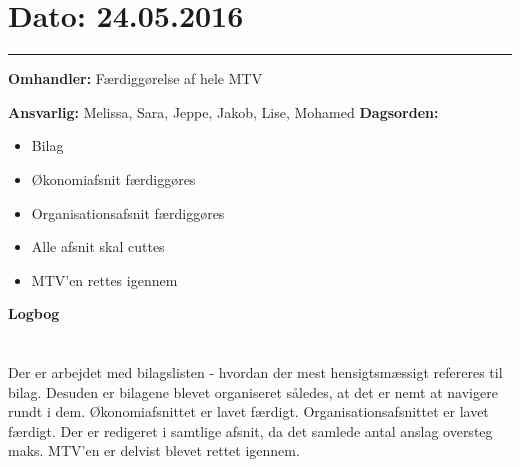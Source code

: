 \section{Dato: 24.05.2016}
\hrule

\textbf{Omhandler:} Færdiggørelse af hele MTV

\textbf{Ansvarlig:} Melissa, Sara, Jeppe, Jakob, Lise, Mohamed
\textbf{Dagsorden:}
\begin{itemize}
	\item Bilag
	\item Økonomiafsnit færdiggøres 
	\item Organisationsafsnit færdiggøres
	\item Alle afsnit skal  cuttes
	\item MTV'en rettes igennem
	
\end{itemize}

\textbf{Logbog}
\\
\\ \\
Der er arbejdet med bilagslisten - hvordan der mest hensigtsmæssigt refereres til bilag. Desuden er bilagene blevet organiseret således, at det er nemt at navigere rundt i dem. 
Økonomiafsnittet er lavet færdigt. 
Organisationsafsnittet er lavet færdigt. 
Der er redigeret i samtlige afsnit, da det samlede antal anslag oversteg maks. 
MTV'en er delvist blevet rettet igennem. 
